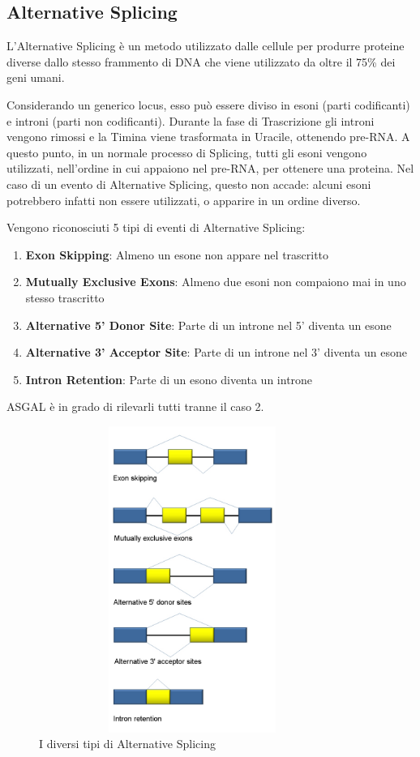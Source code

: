 \subsection{Alternative Splicing}

L'Alternative Splicing è un metodo utilizzato dalle cellule per produrre proteine diverse dallo stesso frammento di DNA che viene utilizzato da oltre il 75\% dei geni umani. 

Considerando un generico locus, esso può essere diviso in esoni (parti codificanti) e introni (parti non codificanti). Durante la fase di Trascrizione gli introni vengono rimossi e la Timina viene trasformata in Uracile, ottenendo pre-RNA. A questo punto, in un normale processo di Splicing, tutti gli esoni vengono utilizzati, nell'ordine in cui appaiono nel pre-RNA, per ottenere una proteina. Nel caso di un evento di Alternative Splicing, questo non accade: alcuni esoni potrebbero infatti non essere utilizzati, o apparire in un ordine diverso. 

Vengono riconosciuti 5 tipi di eventi di Alternative Splicing:

\begin{enumerate}
	\item \textbf{Exon Skipping}: Almeno un esone non appare nel trascritto
	\item \textbf{Mutually Exclusive Exons}: Almeno due esoni non compaiono mai in uno stesso trascritto
	\item \textbf{Alternative 5' Donor Site}: Parte di un introne nel 5' diventa un esone
	\item \textbf{Alternative 3' Acceptor Site}: Parte di un introne nel 3' diventa un esone
	\item \textbf{Intron Retention}: Parte di un esono diventa un introne
\end{enumerate}

ASGAL è in grado di rilevarli tutti tranne il caso 2.

\begin{figure}[h]
	\centering
	\includegraphics[height=10cm,width=10cm]{images/alternativesplicingevents.jpg}
  \caption{I diversi tipi di Alternative Splicing}
  \label{fig:AlternativeSplicingTypes}
\end{figure}